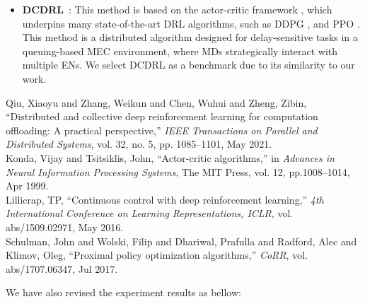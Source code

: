 \documentclass[12pt,draftclsnofoot,onecolumn]{IEEEtran}
\newcommand{\rev}[1]{{\color{blue}#1}} %
\newcommand{\rev}[1]{#1}
\newenvironment{my}[2]%
{\begin{list}{}%
{\setlength{\rightmargin}{#1}\setlength{\leftmargin}{#2}}%


 \item[]{}

} {\end{list}}
\begin{document}
\begin{enumerate}
\begin{my}{1cm}{1cm}
{{\begin{itemize}
				\color{blue}
				\item \textbf{DCDRL}~\cite{qiu2020distributed}: This method is based on the actor-critic framework \cite{NIPS1999_6449f44a}, which underpins many state-of-the-art DRL algorithms, such as DDPG \cite{lillicrap2015continuous}, and PPO \cite{schulman2017proximal}. This method is a distributed algorithm designed for delay-sensitive tasks in a queuing-based MEC environment, where MDs strategically interact with multiple ENs. We select DCDRL as a benchmark due to its similarity to our work. 
				
				
				
			\end{itemize}
			
	}}
\end{my}\vspace{5mm}

\begin{my}{1cm}{1cm}
	\rev{
		{\small
			\noindent\hspace{-0.5mm}\cite{qiu2020distributed} Qiu, Xiaoyu and Zhang, Weikun and Chen, Wuhui and Zheng, Zibin, ``Distributed and collective deep reinforcement learning for computation offloading: A practical perspective,'' \textit{IEEE Transactions on Parallel and Distributed Systems}, vol. 32, no. 5, pp. 1085--1101, May 2021.\\[10pt]
			\cite{NIPS1999_6449f44a} Konda, Vijay and Tsitsiklis, John, ``Actor-critic algorithms,'' in \textit{Advances in Neural Information Processing Systems}, The {MIT} Press, vol. 12, pp.1008--1014, Apr 1999.\\[10pt]
			\cite{lillicrap2015continuous} Lillicrap, TP, ``Continuous control with deep reinforcement learning,'' \textit{4th International Conference on Learning Representations, {ICLR}}, vol. abs/1509.02971, May 2016.\\[10pt]
			\cite{schulman2017proximal} Schulman, John and Wolski, Filip and Dhariwal, Prafulla and Radford, Alec and Klimov, Oleg, ``Proximal policy optimization algorithms,'' \textit{CoRR}, vol. abs/1707.06347, Jul 2017.}\\}
\end{my}





We have also revised the experiment results as bellow: 


\setcounter{figure}{2}


\end{enumerate}
\end{document}
